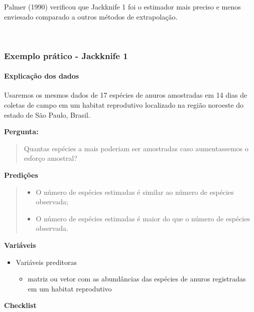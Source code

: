 \documentclass[
]{book}
\providecommand{\tightlist}{%
  \setlength{\itemsep}{0pt}\setlength{\parskip}{0pt}}
\begin{document}
Palmer (1990) verificou que Jackknife 1 foi o estimador mais preciso e menos enviesado comparado a outros métodos de extrapolação.

~

\hypertarget{exemplo-pruxe1tico---jackknife-1}{%
\subsubsection{Exemplo prático - Jackknife 1}\label{exemplo-pruxe1tico---jackknife-1}}

\hypertarget{explicauxe7uxe3o-dos-dados-3}{%
\paragraph{Explicação dos dados}\label{explicauxe7uxe3o-dos-dados-3}}

Usaremos os mesmos dados de 17 espécies de anuros amostradas em 14 dias de coletas de campo em um habitat reprodutivo localizado na região noroeste do estado de São Paulo, Brasil.

\textbf{Pergunta:}

\begin{quote}
Quantas espécies a mais poderiam ser amostradas caso aumentassemos o esforço amostral?
\end{quote}

\textbf{Predições}

\begin{quote}
\begin{itemize}
\tightlist
\item
  O número de espécies estimadas é similar ao número de espécies observada;
\item
  O número de espécies estimadas é maior do que o número de espécies observada.
\end{itemize}
\end{quote}

\textbf{Variáveis}

\begin{itemize}
\tightlist
\item
  Variáveis preditoras

  \begin{itemize}
  \tightlist
  \item
    matriz ou vetor com as abundâncias das espécies de anuros registradas em um habitat reprodutivo
  \end{itemize}
\end{itemize}

\textbf{Checklist}
\end{document}
